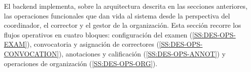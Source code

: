 El backend implementa, sobre la arquitectura descrita en las secciones
anteriores, las operaciones funcionales que dan vida al sistema desde
la perspectiva del coordinador, el corrector y el gestor de la
organización. Esta sección recorre los flujos operativos en cuatro
bloques: configuración del examen (\cref{SS:DES-OPS-EXAM}), convocatoria
y asignación de correctores (\cref{SS:DES-OPS-CONVOCATION}), anotaciones
y calificación (\cref{SS:DES-OPS-ANNOT}) y operaciones de organización
(\cref{SS:DES-OPS-ORG}).
